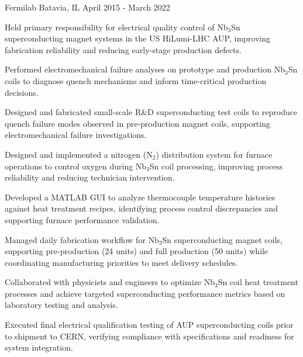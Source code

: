 \begin{cventries}
{Fermilab}
{Batavia, IL}
{April 2015 - March 2022}
{
\begin{cvitems}
\item {Held primary responsibility for electrical quality control of Nb$_3$Sn superconducting magnet systems in the US HiLumi-LHC AUP, improving fabrication reliability and reducing early-stage production defects.}
\item {Performed electromechanical failure analyses on prototype and production Nb$_3$Sn coils to diagnose quench mechanisms and inform time-critical production decisions.}
\item {Designed and fabricated small-scale R\&D superconducting test coils to reproduce quench failure modes observed in pre-production magnet coils, supporting electromechanical failure investigations.}
\item {Designed and implemented a nitrogen (N$_2$) distribution system for furnace operations to control oxygen during Nb$_3$Sn coil processing, improving process reliability and reducing technician intervention.}
\item {Developed a MATLAB GUI to analyze thermocouple temperature histories against heat treatment recipes, identifying process control discrepancies and supporting furnace performance validation.}
\item {Managed daily fabrication workflow for Nb$_3$Sn superconducting magnet coils, supporting pre-production (24 units) and full production (50 units) while coordinating manufacturing priorities to meet delivery schedules.}
\item {Collaborated with physicists and engineers to optimize Nb$_3$Sn coil heat treatment processes and achieve targeted superconducting performance metrics based on laboratory testing and analysis.}
\item {Executed final electrical qualification testing of AUP superconducting coils prior to shipment to CERN, verifying compliance with specifications and readiness for system integration.}
\end{cvitems}
}
\vspace{3mm}


\end{cventries}
